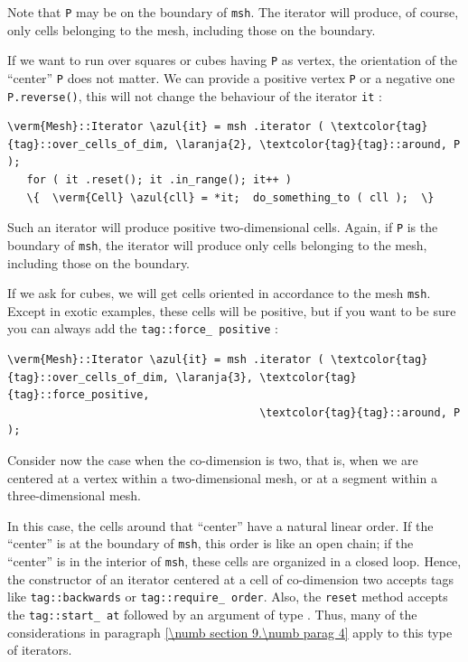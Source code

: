 Note that {\small\tt P} may be on the boundary of {\small\tt msh}.
The iterator will produce, of course, only cells belonging to the mesh, including those
on the boundary.

If we want to run over squares or cubes having {\small\tt P} as vertex,
the orientation of the ``center'' {\small\tt P} does not matter.
We can provide a positive vertex {\small\tt P} or a negative one {\small\tt P.reverse()},
this will not change the behaviour of the iterator {\small\tt it} :

\begin{Verbatim}[commandchars=\\\{\},formatcom=\small\tt,
   baselinestretch=0.94,framesep=2mm                      ]
   \verm{Mesh}::Iterator \azul{it} = msh .iterator ( \textcolor{tag}{tag}::over_cells_of_dim, \laranja{2}, \textcolor{tag}{tag}::around, P );
   for ( it .reset(); it .in_range(); it++ )
   \{  \verm{Cell} \azul{cll} = *it;  do_something_to ( cll );  \}
\end{Verbatim}

Such an iterator will produce positive two-dimensional cells.
Again, if {\small\tt P} is the boundary of {\small\tt msh}, the iterator will produce
only cells belonging to the mesh, including those on the boundary.

If we ask for cubes, we will get cells oriented in accordance to the mesh {\small\tt msh}.
Except in exotic examples, these cells will be positive, but if you want to be sure you
can always add the {\small\tt\textcolor{tag}{tag}::force\_\,positive} :

\begin{Verbatim}[commandchars=\\\{\},formatcom=\small\tt,
   baselinestretch=0.94,framesep=2mm                      ]
   \verm{Mesh}::Iterator \azul{it} = msh .iterator ( \textcolor{tag}{tag}::over_cells_of_dim, \laranja{3}, \textcolor{tag}{tag}::force_positive,
                                       \textcolor{tag}{tag}::around, P                                 );
\end{Verbatim}

Consider now the case when the co-dimension is two, that is, when we are centered at a vertex
within a two-dimensional mesh, or at a segment within a three-dimensional mesh.

In this case, the cells around that ``center'' have a natural linear order.
If the ``center'' is at the boundary of {\small\tt msh}, this order is like an
open chain; if the ``center'' is in the interior of {\small\tt msh}, these cells
are organized in a closed loop.
Hence, the constructor of an iterator centered at a cell of co-dimension two accepts
tags like {\small\tt\textcolor{tag}{tag}::backwards} or {\small\tt\textcolor{tag}{tag}::require\_\,order}.
Also, the {\small\tt reset} method accepts the {\small\tt\textcolor{tag}{tag}::start\_\,at} followed
by an argument of type {\small\tt{}}.
Thus, many of the considerations in paragraph \ref{\numb section 9.\numb parag 4}
apply to this type of iterators.

